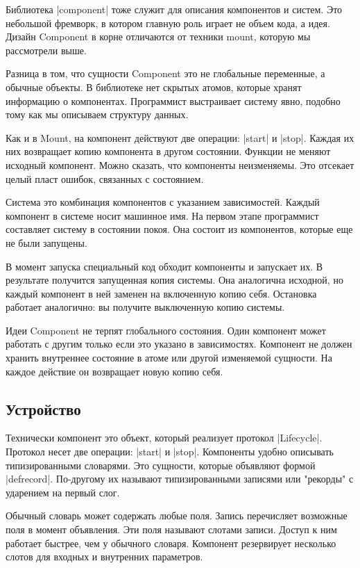 Библиотека \spverb|component|
тоже служит для описания компонентов и систем. Это небольшой фремворк, в котором
главную роль играет не объем кода, а идея. Дизайн Component в корне отличаются
от техники mount, которую мы рассмотрели выше.

Разница в том, что сущности Component это не глобальные переменные, а обычные
объекты. В библиотеке нет скрытых атомов, которые хранят информацию о
компонентах. Программист выстраивает систему явно, подобно тому как мы описываем
структуру данных.

Как и в Mount, на компонент действуют две операции: \spverb|start| и \spverb|stop|. Каждая их
них возвращает копию компонента в другом состоянии. Функции не меняют исходный
компонент. Можно сказать, что компоненты неизменяемы. Это отсекает целый пласт
ошибок, связанных с состоянием.

Система это комбинация компонентов с указанием зависимостей. Каждый компонент в
системе носит машинное имя. На первом этапе программист составляет систему в
состоянии покоя. Она состоит из компонентов, которые еще не были запущены.

В момент запуска специальный код обходит компоненты и запускает их. В результате
получится запущенная копия системы. Она аналогична исходной, но каждый компонент
в ней заменен на включенную копию себя. Остановка работает аналогично: вы
получите выключенную копию системы.

Идеи Component не терпят глобального состояния. Один компонент может работать с
другим только если это указано в зависимостях. Компонент не должен хранить
внутреннее состояние в атоме или другой изменяемой сущности. На каждое действие
он возвращает новую копию себя.

\subsection{Устройство}

Технически компонент это объект, который реализует протокол
\spverb|Lifecycle|. Протокол несет две операции: \spverb|start| и \spverb|stop|. Компоненты удобно
описывать типизированными словарями. Это сущности, которые объявляют формой
\spverb|defrecord|. По-другому их называют типизированными записями или "рекорды" с
ударением на первый слог.

Обычный словарь может содержать любые поля. Запись перечисляет возможные поля в
момент объявления. Эти поля называют слотами записи. Доступ к ним работает
быстрее, чем у обычного словаря. Компонент резервирует несколько слотов для
входных и внутренних параметров.

